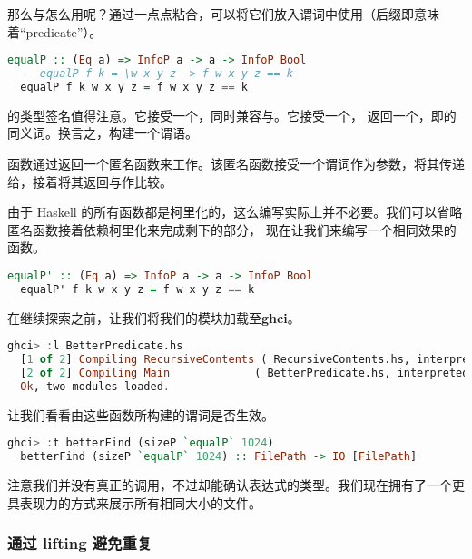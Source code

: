 \documentclass[./main.tex]{subfiles}
\begin{document}
那么与怎么用呢？通过一点点粘合，可以将它们放入谓词中使用（后缀即意味着“predicate”）。

\begin{lstlisting}[language=Haskell]
  equalP :: (Eq a) => InfoP a -> a -> InfoP Bool
  -- equalP f k = \w x y z -> f w x y z == k
  equalP f k w x y z = f w x y z == k
\end{lstlisting}

的类型签名值得注意。它接受一个，同时兼容与。它接受一个，
返回一个，即的同义词。换言之，构建一个谓语。

函数通过返回一个匿名函数来工作。该匿名函数接受一个谓词作为参数，将其传递给，接着将其返回与作比较。

由于 Haskell 的所有函数都是柯里化的，这么编写实际上并不必要。我们可以省略匿名函数接着依赖柯里化来完成剩下的部分，
现在让我们来编写一个相同效果的函数。

\begin{lstlisting}[language=Haskell]
  equalP' :: (Eq a) => InfoP a -> a -> InfoP Bool
  equalP' f k w x y z = f w x y z == k
\end{lstlisting}

在继续探索之前，让我们将我们的模块加载至\textbf{ghci}。

\begin{lstlisting}[language=Haskell]
  ghci> :l BetterPredicate.hs
  [1 of 2] Compiling RecursiveContents ( RecursiveContents.hs, interpreted )
  [2 of 2] Compiling Main             ( BetterPredicate.hs, interpreted )
  Ok, two modules loaded.
\end{lstlisting}

让我们看看由这些函数所构建的谓词是否生效。

\begin{lstlisting}[language=Haskell]
  ghci> :t betterFind (sizeP `equalP` 1024)
  betterFind (sizeP `equalP` 1024) :: FilePath -> IO [FilePath]
\end{lstlisting}

注意我们并没有真正的调用，不过却能确认表达式的类型。我们现在拥有了一个更具表现力的方式来展示所有相同大小的文件。

\subsubsection*{通过 lifting 避免重复}
\end{document}
